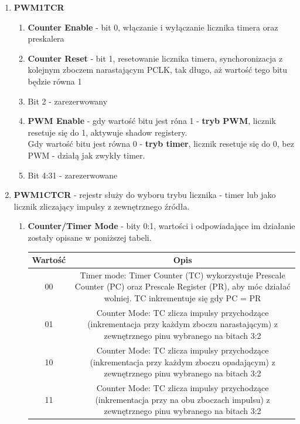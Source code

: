 \begin{enumerate}
\begin{enumerate}
\begin{enumerate}
        \end{enumerate}
        \item \textbf{PWM1TCR}
        \begin{enumerate}
            \item \textbf{Counter Enable} - bit 0, włączanie i wyłączanie licznika timera oraz preskalera
            \item \textbf{Counter Reset} - bit 1, resetowanie licznika timera, synchoronizacja z kolejnym zboczem narastającym PCLK, tak długo, aż wartość tego bitu będzie równa 1
            \item Bit 2 - zarezerwowany
            \item \textbf{PWM Enable} - gdy wartość bitu jest róna 1 - \textbf{tryb PWM}, licznik resetuje się do 1, aktywuje shadow registery.\\
                            Gdy wartość bitu jest równa 0 - \textbf{tryb timer}, licznik resetuje się do 0, bez PWM - działą jak zwykły timer.
            \item Bit 4:31 - zarezerwowane
        \end{enumerate}
        \item \textbf{PWM1CTCR} - rejestr służy do wyboru trybu licznika - timer lub jako licznik zliczający impulsy z zewnętrznego źródła. 
        \begin{enumerate}
            \item \textbf{Counter/Timer Mode} - bity 0:1, wartości i odpowiadające im działanie zostały opisane w poniższej tabeli.
            \begin{table}[H]
                \centering
                \begin{tabular}{|c|c|}
                    \hline
                    Wartość & Opis\\
                    \hline
                    00  & Timer mode: Timer Counter (TC) wykorzystuje Prescale Counter (PC) oraz Prescale Register (PR), aby móc działać wolniej. TC inkrementuje się gdy PC = PR\\
                    01 & Counter Mode: TC zlicza impulsy przychodzące (inkrementacja przy każdym zboczu narastającym) z zewnętrznego pinu wybranego na bitach 3:2  \\
                    10 & Counter Mode: TC zlicza impulsy przychodzące (inkrementacja przy każdym zboczu opadającym) z zewnętrznego pinu wybranego na bitach 3:2  \\
                    11 & Counter Mode: TC zlicza impulsy przychodzące (inkrementacja przy na obu zboczach impulsu) z zewnętrznego pinu wybranego na bitach 3:2  \\

\end{tabular}
\end{table}
\end{enumerate}
\end{enumerate}
\end{enumerate}
